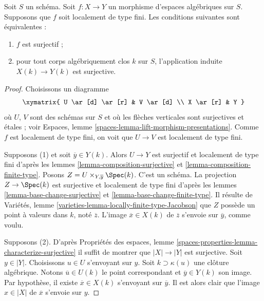 \begin{lemma}
\label{lemma-locally-finite-type-surjective-geometric-points}
Soit $S$ un schéma. Soit $f : X \to Y$ un morphisme d'espaces algébriques
sur $S$. Supposons que $f$ soit localement de type fini. Les conditions suivantes sont équivalentes :
\begin{enumerate}
\item $f$ est surjectif ;
\item pour tout corps algébriquement clos $k$ sur $S$, l'application induite
$X(k) \to Y(k)$ est surjective.
\end{enumerate}
\end{lemma}

\begin{proof}
Choisissons un diagramme
$$
\xymatrix{
U \ar[d] \ar[r] & V \ar[d] \\
X \ar[r] & Y
}
$$
où $U$, $V$ sont des schémas sur $S$ et où les flèches verticales sont surjectives
et étales ; voir
Espaces, lemme \ref{spaces-lemma-lift-morphism-presentations}.
Comme $f$ est localement de type fini, on voit que $U \to V$ est localement de
type fini.

\medskip\noindent
Supposons (1) et soit $\overline{y} \in Y(k)$. Alors $U \to Y$ est
surjectif et localement de type fini d'après les
lemmes \ref{lemma-composition-surjective} et
\ref{lemma-composition-finite-type}.
Posons $Z = U \times_{Y, \overline{y}} \Spec(k)$. C'est un schéma.
La projection $Z \to \Spec(k)$
est surjective et localement de type fini d'après les
lemmes \ref{lemma-base-change-surjective} et
\ref{lemma-base-change-finite-type}.
Il résulte de
Variétés, lemme \ref{varieties-lemma-locally-finite-type-Jacobson}
que $Z$ possède un point à valeurs dans $k$, noté $\overline{z}$. L'image
$\overline{x} \in X(k)$ de $\overline{z}$ s'envoie sur $\overline{y}$,
comme voulu.

\medskip\noindent
Supposons (2). D'après
Propriétés des espaces,
lemme \ref{spaces-properties-lemma-characterize-surjective}
il suffit de montrer que $|X| \to |Y|$ est surjective.
Soit $y \in |Y|$. Choisissons $u \in U$ s'envoyant sur $y$.
Soit $k \supset \kappa(u)$ une clôture algébrique. Notons
$\overline{u} \in U(k)$ le point correspondant et
$\overline{y} \in Y(k)$ son image. Par hypothèse, il existe
$\overline{x} \in X(k)$ s'envoyant sur $\overline{y}$.
Il est alors clair que l'image $x \in |X|$ de $\overline{x}$
s'envoie sur $y$.
\end{proof}

